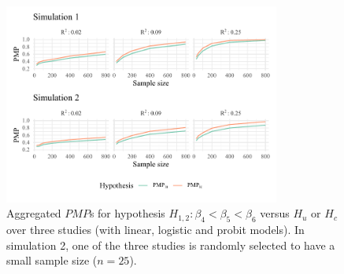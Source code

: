 \documentclass[
  authoryear,
  preprint,
  5p,
  twocolumn]{elsarticle}
\begin{document}
\begin{figure}

{\centering \includegraphics[width=0.81\textwidth,height=\textheight]{manuscript_volker_files/figure-pdf/fig-sim12-2.pdf}

}

\caption{\label{fig-sim12-2}Aggregated \(PMP\)s for hypothesis
\(H_{1,2}: \beta_4 < \beta_5 < \beta_6\) versus \(H_u\) or \(H_c\) over
three studies (with linear, logistic and probit models). In simulation
2, one of the three studies is randomly selected to have a small sample
size (\(n = 25\)).}

\end{figure}
\end{document}
